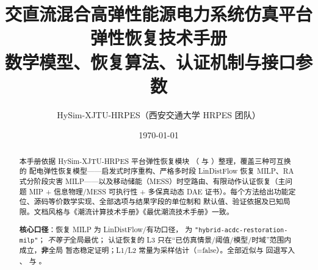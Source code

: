 \documentclass[UTF8,fontset=fandol,a4paper,11pt]{ctexart}
\title{\textbf{交直流混合高弹性能源电力系统仿真平台}\\[0.5em]
       {\Large 弹性恢复技术手册}\\[0.3em]
       {\large 数学模型、恢复算法、认证机制与接口参数}}
\author{HySim-XJTU-HRPES（西安交通大学 HRPES 团队）}
\date{\today}
\begin{document}
\maketitle
\begin{abstract}
\noindent 本手册依据 HySim-XJTU-HRPES 平台弹性恢复模块
（ 与 ）整理，覆盖三种可互换的
配电弹性恢复模型——启发式时序重构、严格多时段 LinDistFlow 恢复 MILP、RA 式分阶段灾害
MILP——以及移动储能（MESS）时空路由、有限动作认证恢复（主问题 MIP + 信息物理/MESS
可执行性 + 多保真动态 DAE 证书）。每个方法给出功能定位、源码等价数学实现、全部选项与结果字段的单位制和
默认值、验证依据及已知局限。文档风格与《潮流计算技术手册》《最优潮流技术手册》一致。

\smallskip
\noindent\textbf{核心口径}：恢复 MILP 为 LinDistFlow/有功口径， 为
\texttt{"hybrid-acdc-restoration-\allowbreak milp"}；
\emph{不等于}全局最优；
认证恢复的 L3  只在“已仿真情景/阈值/模型/时域”范围内成立，\textbf{非}全局
暂态稳定证明；L1/L2 常量为采样估计（=false）。全部近似与
回退写入 、 与 。
\end{abstract}

\tableofcontents
\newpage





















\end{document}
